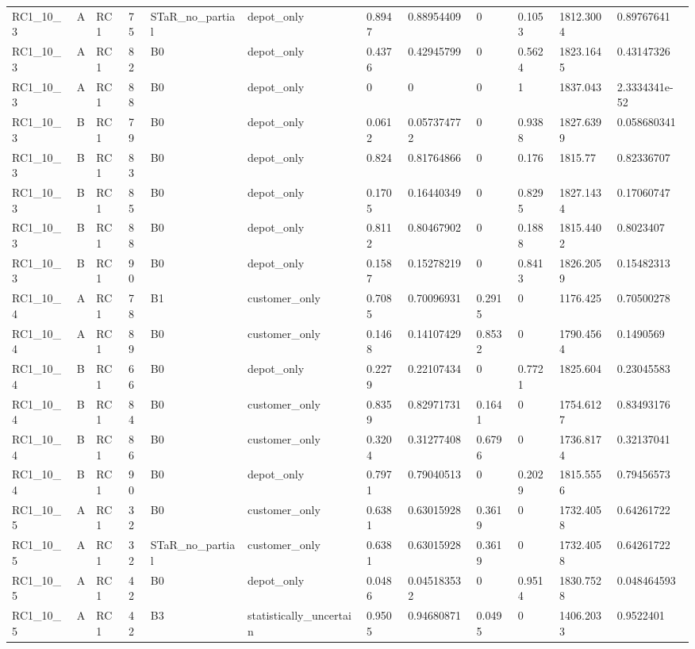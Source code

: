\begin{longtable}{llllllllllll}
RC1\_10\_3 & A & RC1 & 75 & STaR\_no\_partial & depot\_only & 0.8947 & 0.88954409 & 0 & 0.1053 & 1812.3004 & 0.89767641 \\
RC1\_10\_3 & A & RC1 & 82 & B0 & depot\_only & 0.4376 & 0.42945799 & 0 & 0.5624 & 1823.1645 & 0.43147326 \\
RC1\_10\_3 & A & RC1 & 88 & B0 & depot\_only & 0 & 0 & 0 & 1 & 1837.043 & 2.3334341e-52 \\
RC1\_10\_3 & B & RC1 & 79 & B0 & depot\_only & 0.0612 & 0.057374772 & 0 & 0.9388 & 1827.6399 & 0.058680341 \\
RC1\_10\_3 & B & RC1 & 83 & B0 & depot\_only & 0.824 & 0.81764866 & 0 & 0.176 & 1815.77 & 0.82336707 \\
RC1\_10\_3 & B & RC1 & 85 & B0 & depot\_only & 0.1705 & 0.16440349 & 0 & 0.8295 & 1827.1434 & 0.17060747 \\
RC1\_10\_3 & B & RC1 & 88 & B0 & depot\_only & 0.8112 & 0.80467902 & 0 & 0.1888 & 1815.4402 & 0.8023407 \\
RC1\_10\_3 & B & RC1 & 90 & B0 & depot\_only & 0.1587 & 0.15278219 & 0 & 0.8413 & 1826.2059 & 0.15482313 \\
RC1\_10\_4 & A & RC1 & 78 & B1 & customer\_only & 0.7085 & 0.70096931 & 0.2915 & 0 & 1176.425 & 0.70500278 \\
RC1\_10\_4 & A & RC1 & 89 & B0 & customer\_only & 0.1468 & 0.14107429 & 0.8532 & 0 & 1790.4564 & 0.1490569 \\
RC1\_10\_4 & B & RC1 & 66 & B0 & depot\_only & 0.2279 & 0.22107434 & 0 & 0.7721 & 1825.604 & 0.23045583 \\
RC1\_10\_4 & B & RC1 & 84 & B0 & customer\_only & 0.8359 & 0.82971731 & 0.1641 & 0 & 1754.6127 & 0.83493176 \\
RC1\_10\_4 & B & RC1 & 86 & B0 & customer\_only & 0.3204 & 0.31277408 & 0.6796 & 0 & 1736.8174 & 0.32137041 \\
RC1\_10\_4 & B & RC1 & 90 & B0 & depot\_only & 0.7971 & 0.79040513 & 0 & 0.2029 & 1815.5556 & 0.79456573 \\
RC1\_10\_5 & A & RC1 & 32 & B0 & customer\_only & 0.6381 & 0.63015928 & 0.3619 & 0 & 1732.4058 & 0.64261722 \\
RC1\_10\_5 & A & RC1 & 32 & STaR\_no\_partial & customer\_only & 0.6381 & 0.63015928 & 0.3619 & 0 & 1732.4058 & 0.64261722 \\
RC1\_10\_5 & A & RC1 & 42 & B0 & depot\_only & 0.0486 & 0.045183532 & 0 & 0.9514 & 1830.7528 & 0.048464593 \\
RC1\_10\_5 & A & RC1 & 42 & B3 & statistically\_uncertain & 0.9505 & 0.94680871 & 0.0495 & 0 & 1406.2033 & 0.9522401 \\

\end{longtable}
